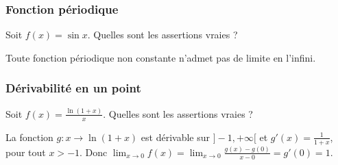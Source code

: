 \subsubsection{Fonction périodique}

\begin{question}

Soit $f(x)= \sin x$. Quelles sont les assertions vraies ?
\begin{answers}

     
    
    
    

 
\end{answers}
\begin{explanations}
Toute fonction périodique non constante n'admet pas de limite en l'infini.
\end{explanations}

\end{question}



\subsubsection{Dérivabilité en un point}

\begin{question}
 
Soit $f(x)= \frac{\ln(1+x)}{x}$. Quelles sont les assertions vraies ?
\begin{answers}

    
    
    
    
\end{answers}
\begin{explanations}
La fonction $g: x\to \ln(1+x)$ est dérivable sur $]-1,+\infty[$  et $g'(x)= \frac{1}{1+x}$, pour tout $x>-1$. Donc  $\lim_{x\to 0}f(x)= \lim_{x\to 0}\frac{g(x)-g(0)}{x-0} = g'(0)=1$.
\end{explanations}

\end{question}


